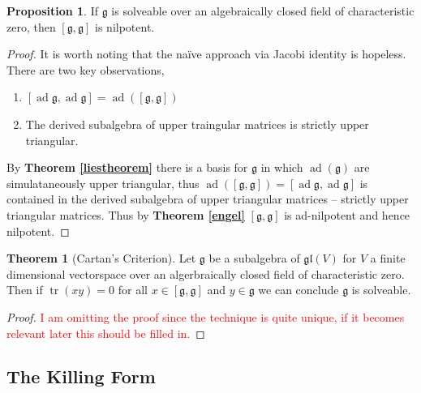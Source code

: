\documentclass[10.5pt]{article}
\theoremstyle{definition}
\newtheorem{proposition}{Proposition}
\newtheorem{theorem}{Theorem}
\numberwithin{example}{subsection}
\numberwithin{proposition}{subsection}
\numberwithin{pb}{subsection}
\begin{document}
        \begin{proposition}\label{corlienilpotence}
            If \(\mathfrak{g}\) is solveable over an algebraically closed field of characteristic zero, then \([\mathfrak{g},\mathfrak{g}]\) is nilpotent.

            \begin{proof}
                It is worth noting that the na\"ive approach via Jacobi identity is hopeless. There are two key observations,
                \begin{enumerate}
                    \item \([\operatorname{ad} \mathfrak{g}, \operatorname{ad} \mathfrak{g}] = \operatorname{ad}([\mathfrak{g},\mathfrak{g}])\)
                    \item The derived subalgebra of upper traingular matrices is strictly upper triangular.
                \end{enumerate}
                By \textbf{Theorem \ref{liestheorem}} there is a basis for \(\mathfrak{g}\) in which \(\operatorname{ad}(\mathfrak{g})\) are simulataneously upper triangular, thus \(\operatorname{ad}([\mathfrak{g},\mathfrak{g}]) = [\operatorname{ad} \mathfrak{g}, \operatorname{ad} \mathfrak{g}]\) is contained in the derived subalgebra of upper triangular matrices -- strictly upper triangular matrices. Thus by \textbf{Theorem \ref{engel}} \([\mathfrak{g},\mathfrak{g}]\) is ad-nilpotent and hence nilpotent.
            \end{proof}
        \end{proposition}

        \begin{theorem}[Cartan's Criterion]\label{cartanscriterion}
            Let \(\mathfrak{g}\) be a subalgebra of \(\mathfrak{gl}(V)\) for \(V\) a finite dimensional vectorspace over an algerbraically closed field of characteristic zero. Then if
            \(\operatorname{tr}(xy) = 0\) for all \(x \in [\mathfrak{g},\mathfrak{g}]\) and \(y \in \mathfrak{g}\) we can conclude \(\mathfrak{g}\) is solveable.

            \begin{proof}
                \textcolor{red}{I am omitting the proof since the technique is quite unique, if it becomes relevant later this should be filled in.}
            \end{proof}
        \end{theorem}
    
    \subsection{The Killing Form}
\end{document}
